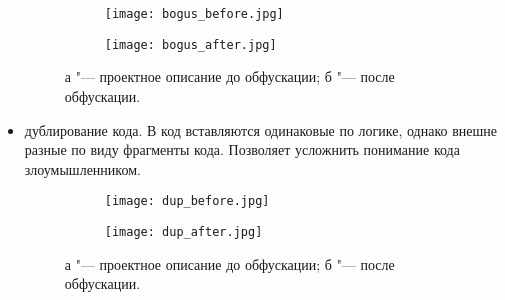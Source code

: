 \begin{itemize}
\begin{figure}[ht]
\centering
  \begin{subfigure}[b]{0.45\textwidth}
    \centering
    \texttt{[image: bogus\_before.jpg]}
    \caption{}
  \end{subfigure}
  \begin{subfigure}[b]{0.45\textwidth}
    \centering
    \texttt{[image: bogus\_after.jpg]}
    \caption{}
  \end{subfigure}
  \caption{ а "--- проектное описание до обфускации;
            б "--- после обфускации.}
  \label{fig:fire_alarms}
\end{figure}


\item дублирование кода. В код вставляются одинаковые по логике, однако внешне разные по виду фрагменты кода. Позволяет усложнить понимание кода злоумышленником.


\begin{figure}[ht]
\centering
  \begin{subfigure}[b]{0.45\textwidth}
    \centering
    \texttt{[image: dup\_before.jpg]}
    \caption{}
  \end{subfigure}
  \begin{subfigure}[b]{0.45\textwidth}
    \centering
    \texttt{[image: dup\_after.jpg]}
    \caption{}
  \end{subfigure}
  \caption{ а "--- проектное описание до обфускации;
            б "--- после обфускации.}
  \label{fig:fire_alarms}
\end{figure}

\end{itemize}

